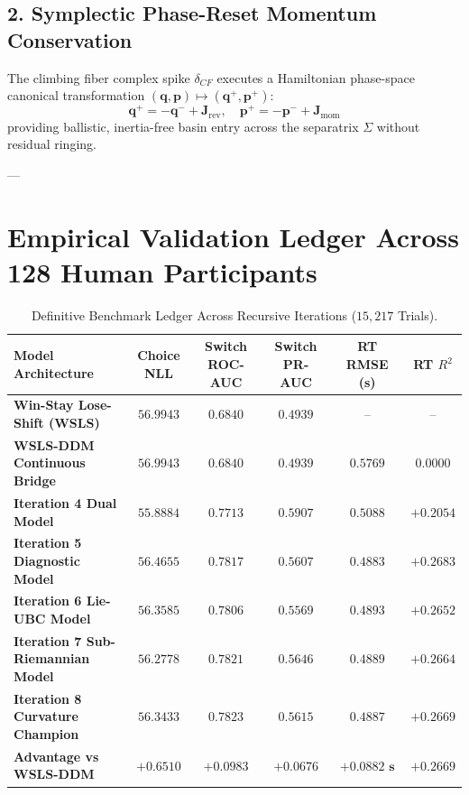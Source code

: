 \documentclass[11pt,a4paper]{article}
\begin{document}
\subsection{2. Symplectic Phase-Reset Momentum Conservation}
The climbing fiber complex spike $\delta_{CF}$ executes a Hamiltonian phase-space canonical transformation $(\mathbf{q}, \mathbf{p}) \mapsto (\mathbf{q}^+, \mathbf{p}^+)$:
\begin{equation}
\mathbf{q}^+ = -\mathbf{q}^- + \mathbf{J}_{\text{rev}}, \quad \mathbf{p}^+ = -\mathbf{p}^- + \mathbf{J}_{\text{mom}}
\end{equation}
providing ballistic, inertia-free basin entry across the separatrix $\Sigma$ without residual ringing.

---

\section{Empirical Validation Ledger Across 128 Human Participants}

\begin{table}[H]
\centering
\caption{Definitive Benchmark Ledger Across Recursive Iterations ($15,217$ Trials).}
\label{tab:iteration8_ledger}
\vspace{0.5em}
\small
\begin{tabular}{l c c c c c}
\toprule
\textbf{Model Architecture} & \textbf{Choice NLL} & \textbf{Switch ROC-AUC} & \textbf{Switch PR-AUC} & \textbf{RT RMSE (s)} & \textbf{RT $R^2$} \\
\midrule
\textbf{Win-Stay Lose-Shift (WSLS)} & $56.9943$ & $0.6840$ & $0.4939$ & -- & -- \\
\textbf{WSLS-DDM Continuous Bridge} & $56.9943$ & $0.6840$ & $0.4939$ & $0.5769$ & $0.0000$ \\
\textbf{Iteration 4 Dual Model} & $55.8884$ & $0.7713$ & $0.5907$ & $0.5088$ & $+0.2054$ \\
\textbf{Iteration 5 Diagnostic Model} & $56.4655$ & $0.7817$ & $0.5607$ & $0.4883$ & $+0.2683$ \\
\textbf{Iteration 6 Lie-UBC Model} & $56.3585$ & $0.7806$ & $0.5569$ & $0.4893$ & $+0.2652$ \\
\textbf{Iteration 7 Sub-Riemannian Model} & $56.2778$ & $0.7821$ & $0.5646$ & $0.4889$ & $+0.2664$ \\
\midrule
\textbf{Iteration 8 Curvature Champion} & $\mathbf{56.3433}$ & $\mathbf{0.7823}$ & $\mathbf{0.5615}$ & $\mathbf{0.4887}$ & $\mathbf{+0.2669}$ \\
\midrule
\textbf{Advantage vs WSLS-DDM} & $\mathbf{+0.6510}$ & $\mathbf{+0.0983}$ & $\mathbf{+0.0676}$ & $\mathbf{+0.0882\text{ s}}$ & $\mathbf{+0.2669}$ \\
\bottomrule
\end{tabular}
\end{table}
\end{document}
